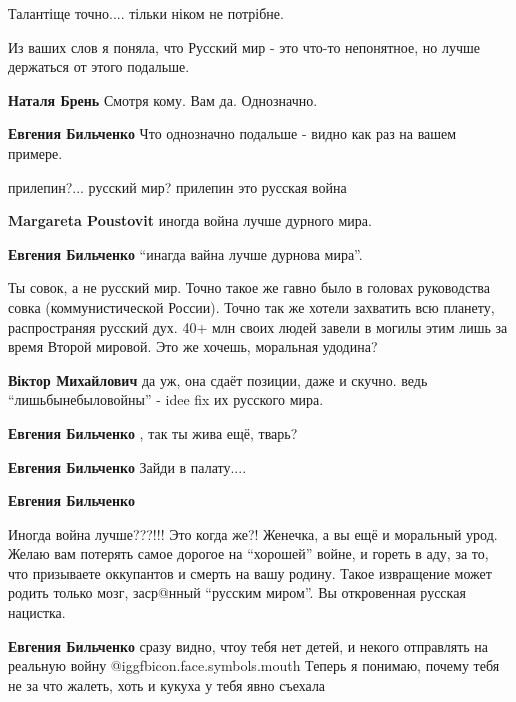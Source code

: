 \begin{itemize}
\begin{itemize}
Талантіще точно.... тільки ніком не потрібне.

\end{itemize} %


Из ваших слов я поняла, что Русский мир - это что-то непонятное, но лучше
держаться от этого подальше.

\begin{itemize} %
\textbf{Наталя Брень} Смотря кому. Вам да. Однозначно.

\textbf{Евгения Бильченко} Что однозначно подальше - видно как раз на вашем примере.
\end{itemize} %

прилепин?... русский мир? прилепин это русская война

\begin{itemize} %
\textbf{Margareta Poustovit} иногда война лучше дурного мира.

\textbf{Евгения Бильченко}
\enquote{инагда вайна лучше дурнова мира}.

Ты совок, а не русский мир. Точно такое же гавно было в головах руководства
совка (коммунистической России). Точно так же хотели захватить всю планету,
распространяя русский дух. 40+ млн своих людей завели в могилы этим лишь за
время Второй мировой. Это же хочешь, моральная удодина?

\textbf{Віктор Михайлович} да уж, она сдаёт позиции, даже и скучно. ведь \enquote{лишьбынебыловойны} - idee fix их русского мира.

\textbf{Евгения Бильченко} , так ты жива ещё, тварь?

\textbf{Евгения Бильченко} Зайди в палату....

\textbf{Евгения Бильченко} 

Иногда война лучше???!!! Это когда же?! Женечка, а вы ещё и моральный урод.
Желаю вам потерять самое дорогое на \enquote{хорошей} войне, и гореть в аду, за то, что
призываете оккупантов и смерть на вашу родину. Такое извращение может родить
только мозг, заср@нный \enquote{русским миром}. Вы откровенная русская нацистка.


\textbf{Евгения Бильченко} сразу видно, чтоу тебя нет детей, и некого отправлять на реальную войну  @igg{fbicon.face.symbols.mouth} 
Теперь я понимаю, почему тебя не за что жалеть, хоть и кукуха у тебя явно съехала


\end{itemize}
\end{itemize}
